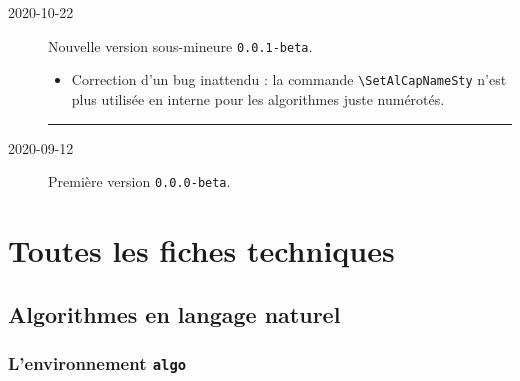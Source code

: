 \documentclass[12pt,a4paper]{article}
\theoremstyle{definition}
\newcommand\separation{
    \medskip
    \hfill\rule{0.5\textwidth}{0.75pt}\hfill
    \medskip
}
\begin{document}
\begin{description}

    \medskip
    \item[2020-10-22] Nouvelle version sous-mineure \verb+0.0.1-beta+.
    
    \begin{itemize}[itemsep=.5em]
        \item Correction d'un bug inattendu : la commande \verb#\SetAlCapNameSty# n'est plus utilisée en interne pour les algorithmes juste numérotés.
    
    
    \end{itemize}
    
    \separation
    


    \medskip
    \item[2020-09-12] Première version \verb+0.0.0-beta+.


\end{description}


\newpage
\section{Toutes les fiches techniques} \label{techincal-ids}





















\subsection{Algorithmes en langage naturel}

\subsubsection{L'environnement \texttt{algo}}



\end{document}
